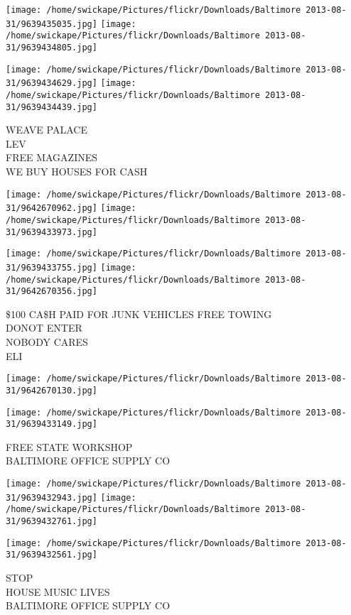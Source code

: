 \documentclass[10pt,letterpaper]{article}
\begin{document}
\texttt{[image: /home/swickape/Pictures/flickr/Downloads/Baltimore 2013-08-31/9639435035.jpg]}
\texttt{[image: /home/swickape/Pictures/flickr/Downloads/Baltimore 2013-08-31/9639434805.jpg]}

\texttt{[image: /home/swickape/Pictures/flickr/Downloads/Baltimore 2013-08-31/9639434629.jpg]}
\texttt{[image: /home/swickape/Pictures/flickr/Downloads/Baltimore 2013-08-31/9639434439.jpg]}

WEAVE PALACE\\
LEV\\
FREE MAGAZINES\\
WE BUY HOUSES FOR CASH
\pagebreak

\texttt{[image: /home/swickape/Pictures/flickr/Downloads/Baltimore 2013-08-31/9642670962.jpg]}
\texttt{[image: /home/swickape/Pictures/flickr/Downloads/Baltimore 2013-08-31/9639433973.jpg]}

\texttt{[image: /home/swickape/Pictures/flickr/Downloads/Baltimore 2013-08-31/9639433755.jpg]}
\texttt{[image: /home/swickape/Pictures/flickr/Downloads/Baltimore 2013-08-31/9642670356.jpg]}

\$100 CA\$H PAID FOR JUNK VEHICLES FREE TOWING\\
DONOT ENTER\\
NOBODY CARES\\
ELI
\pagebreak

\texttt{[image: /home/swickape/Pictures/flickr/Downloads/Baltimore 2013-08-31/9642670130.jpg]}

\vspace{0.25in}
\texttt{[image: /home/swickape/Pictures/flickr/Downloads/Baltimore 2013-08-31/9639433149.jpg]}

FREE STATE WORKSHOP\\
BALTIMORE OFFICE SUPPLY CO
\pagebreak

\texttt{[image: /home/swickape/Pictures/flickr/Downloads/Baltimore 2013-08-31/9639432943.jpg]}
\texttt{[image: /home/swickape/Pictures/flickr/Downloads/Baltimore 2013-08-31/9639432761.jpg]}

\vspace{0.25in}
\texttt{[image: /home/swickape/Pictures/flickr/Downloads/Baltimore 2013-08-31/9639432561.jpg]}

STOP\\
HOUSE MUSIC LIVES\\
BALTIMORE OFFICE SUPPLY CO
\pagebreak
\end{document}
